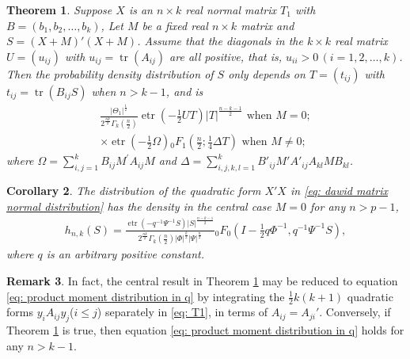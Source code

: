 \documentclass{amsart}
\newtheorem{theorem}{Theorem}[section]
\newtheorem{corollary}[theorem]{Corollary}
\theoremstyle{definition}
\newtheorem{remark}[theorem]{Remark}
\numberwithin{equation}{section}
\begin{document}
\begin{theorem} \label{thm: main theorem}  Suppose $X$ is an $n\times k$  real normal matrix $T_1$ with $B = ( b_{1}, b_{2},\dots, b_k)$,
Let $ M$ be a fixed real $n\times k$ matrix and $ S =  (X +  M)'(X +  M)$. Assume that the diagonals in the $k\times k$ real matrix $ U = (u_{ij})$ with $u_{ij} = \operatorname{tr}( A_{ij})$ are all positive, that is, $u_{ii}>0 \, (i=1,2,\dots,k)$. Then the probability density distribution of $ S$ only depends on $ T %
= (t_{ij})$ with 
    $t_{ij} = \operatorname{tr}( B_{ij}  S)$ when $n > k - 1$, and is 
        \begin{eqnarray}
         \frac{| \varTheta_{1}|^{\frac{1}{2}}}{2^{\frac{nk}{2}}\varGamma_{k}(\frac{n}{2})} \operatorname{etr} \left(-\frac{1}{2}  U T \right) | T|^{\frac{n-k-1}{2}}          \text{ when } {M}=0; \\
                \times \operatorname{etr} \left(-\frac{1}{2}  \varOmega\right){}_{0}F_{1}\left(\frac{n}{2};\frac{1}{4} \varDelta  T\right) \text{ when } {M}\neq0;
        \end{eqnarray}
        where $\varOmega = \sum_{i,j=1}^{k} B_{ij}  M^{\prime}   A_{ij}  M$ and $ \varDelta = \sum_{i,j,k,l=1}^{k} B'_{ij} M'A'_{ij}A_{kl} M B_{kl}$.
\end{theorem}


    
\begin{corollary}\label{lem: any p}
The distribution of the quadratic form $X'X$ in \eqref{eq: dawid matrix normal distribution} has the density in the central case $M = 0$ for any $n > p-1$,
\begin{equation}
    \begin{aligned}
    h_{n,k}( S) = \frac{ \operatorname{etr}\left( -q^{-1} \varPsi^{-1} S\right)| S|^{\frac{n-k-1}{2}} }{2^{\frac{nk}{2}}\varGamma_{k}(\frac{n}{2})| \varPhi|^{\frac{k}{2}}| \varPsi|^{\frac{n}{2}}}{_{0}}F_{0}\left( I - \frac{1}{2}q \varPhi^{-1}, q^{-1} \varPsi^{-1} S\right), 
\end{aligned}\label{eq: product moment distribution in q}
\end{equation}
where $q$ is an arbitrary positive constant.
\end{corollary}


\begin{remark}\label{rem: reduction}
    In fact, the central result in Theorem \ref{thm: main theorem} may be reduced to equation \eqref{eq: product moment distribution in q} by integrating the $\frac{1}{2}k(k+1)$ quadratic forms $y_{i} A_{ij} y_{j}$($i\leq j$) separately in \eqref{eq: T1}, in terms of $ A_{ij} =  A_{ji}'$. Conversely, if Theorem \ref{thm: main theorem} is true, then equation \eqref{eq: product moment distribution in q} holds for any $n > k-1$.
\end{remark}
\end{document}
